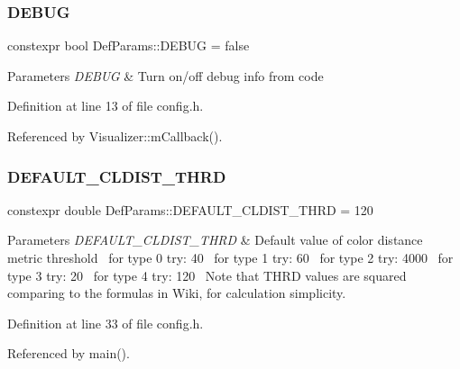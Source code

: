 \subsubsection{\texorpdfstring{DEBUG}{DEBUG}}
{\footnotesize\ttfamily constexpr bool Def\+Params\+::\+D\+E\+B\+UG = false}


\begin{DoxyParams}{Parameters}
{\em D\+E\+B\+UG} & Turn on/off debug info from code \\
\hline
\end{DoxyParams}


Definition at line 13 of file config.\+h.



Referenced by Visualizer\+::m\+Callback().

\mbox{\label{namespace_def_params_a916e62b53c201e054434217cc5d70a0a}} 
\subsubsection{\texorpdfstring{DEFAULT\_CLDIST\_THRD}{DEFAULT\_CLDIST\_THRD}}
{\footnotesize\ttfamily constexpr double Def\+Params\+::\+D\+E\+F\+A\+U\+L\+T\+\_\+\+C\+L\+D\+I\+S\+T\+\_\+\+T\+H\+RD = 120}


\begin{DoxyParams}{Parameters}
{\em D\+E\+F\+A\+U\+L\+T\+\_\+\+C\+L\+D\+I\+S\+T\+\_\+\+T\+H\+RD} & Default value of color distance metric threshold~\newline
for type 0 try\+: 40~\newline
for type 1 try\+: 60~\newline
for type 2 try\+: 4000~\newline
for type 3 try\+: 20~\newline
for type 4 try\+: 120~\newline
Note that T\+H\+RD values are squared comparing to the formulas in Wiki, for calculation simplicity. \\
\hline
\end{DoxyParams}


Definition at line 33 of file config.\+h.



Referenced by main().

\mbox{\label{namespace_def_params_a96abaa9fd1fd3e492f2c968328d78cd7}} 
